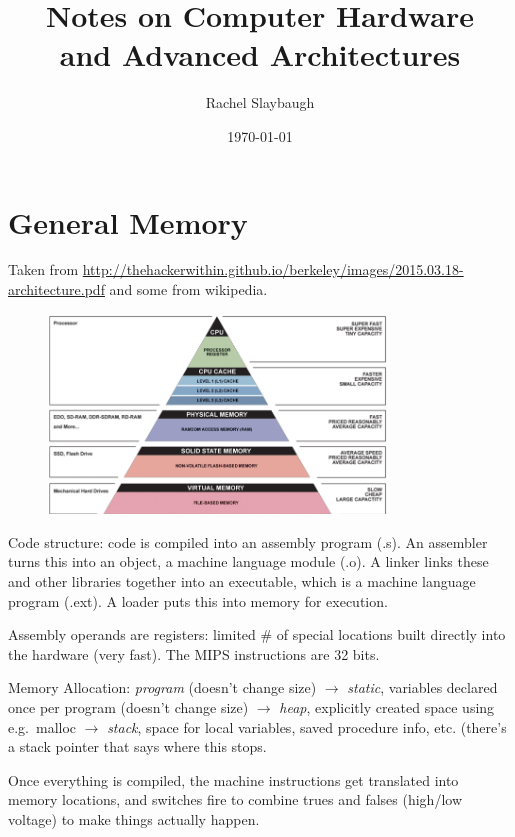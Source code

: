 \documentclass[12pt,twoside]{article}
\date{\today}
\title{Notes on Computer Hardware \\and Advanced Architectures}
\author{Rachel Slaybaugh}
\begin{document}
\maketitle

\section*{General Memory}
Taken from \href{http://thehackerwithin.github.io/berkeley/images/2015.03.18-architecture.pdf}{http://thehackerwithin.github.io/berkeley/images/2015.03.18-architecture.pdf} and some from wikipedia.

\begin{figure}[!ht]
\begin{center}
  \includegraphics[width=0.8\textwidth, height=0.45\textheight]{cpu-memory-hierarchy}
  \label{fig:cpu-memory}
\end{center}
\end{figure}

Code structure: code is compiled into an assembly program (.s). An assembler turns this into an object, a machine language module (.o). A linker links these and other libraries together into an executable, which is a machine language program (.ext). A loader puts this into memory for execution.

Assembly operands are registers: limited \# of special locations built directly into the hardware (very fast). The MIPS instructions are 32 bits. 

Memory Allocation: \textit{program} (doesn't change size) $\rightarrow$ \textit{static}, variables declared once per program (doesn't change size) $\rightarrow$ \textit{heap}, explicitly created space using e.g.\ malloc $\rightarrow$ \textit{stack}, space for local variables, saved procedure info, etc. (there's a stack pointer that says where this stops.

Once everything is compiled, the machine instructions get translated into memory locations, and switches fire to combine trues and falses (high/low voltage) to make things actually happen.
\end{document}
